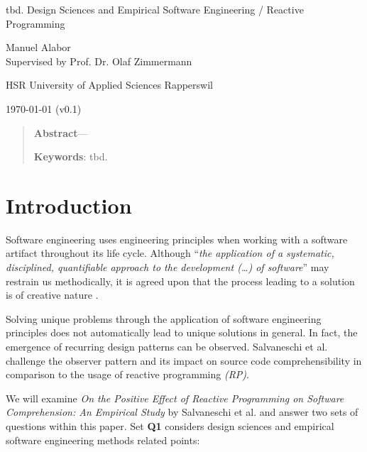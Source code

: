 \documentclass[12pt,a4paper]{article}
\newcommand{\version}{v0.1}
\begin{document}
\begin{centering}
	\Huge{tbd. Design Sciences and Empirical Software Engineering / Reactive Programming}
	\par
	\vspace{2ex}

	\normalsize{
		Manuel Alabor\\
		Supervised by Prof. Dr. Olaf Zimmermann\\
		\par
		\vspace{2ex}
		HSR University of Applied Sciences Rapperswil\\
		\par
		\vspace{2ex}
		\today{} (\version)
	}
	\par
	\vspace{2ex}

	\begin{quotation}
		\small{
			\textbf{Abstract}---
		}
		\par
		\vspace{2ex}

		\small{
			\textbf{Keywords}: tbd.
		}
		\par
		\vspace{4ex}
	\end{quotation}
\end{centering}

\section{Introduction}
Software engineering uses engineering principles when working with a software artifact \cite{159342} throughout its life cycle. Although ``\emph{the application of a systematic, disciplined, quantifiable approach to the development (\dots) of software}'' \cite{159342} may restrain us methodically, it is agreed upon that the process leading to a solution is of creative nature \cite{8051350}.

Solving unique problems through the application of software engineering principles does not automatically lead to unique solutions in general. In fact, the emergence of recurring design patterns can be observed. Salvaneschi et al. \cite{7827078} challenge the observer pattern \cite{gamma1995design} and its impact on source code comprehensibility in comparison to the usage of reactive programming \emph{(RP)}.

We will examine \emph{On the Positive Effect of Reactive Programming on Software Comprehension: An Empirical Study} by Salvaneschi et al. \cite{7827078} and answer two sets of questions within this paper. Set \textbf{Q1} considers design sciences and empirical software engineering methods related points:
\end{document}
